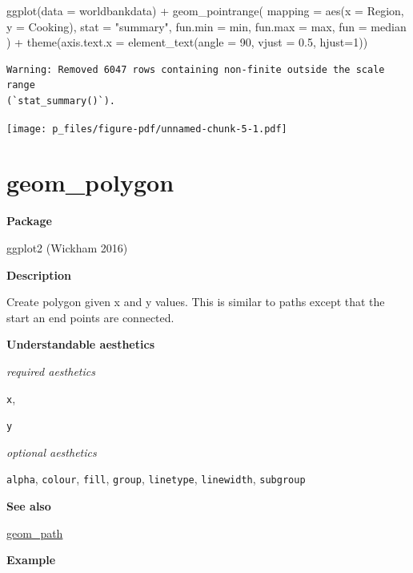 \documentclass[
  letterpaper,
  DIV=11,
  numbers=noendperiod]{scrreprt}
\newenvironment{Shaded}{\begin{snugshade}}{\end{snugshade}}
\newcommand{\AttributeTok}[1]{\textcolor[rgb]{0.40,0.45,0.13}{#1}}
\newcommand{\DecValTok}[1]{\textcolor[rgb]{0.68,0.00,0.00}{#1}}
\newcommand{\FloatTok}[1]{\textcolor[rgb]{0.68,0.00,0.00}{#1}}
\newcommand{\FunctionTok}[1]{\textcolor[rgb]{0.28,0.35,0.67}{#1}}
\newcommand{\NormalTok}[1]{\textcolor[rgb]{0.00,0.23,0.31}{#1}}
\newcommand{\SpecialCharTok}[1]{\textcolor[rgb]{0.37,0.37,0.37}{#1}}
\newcommand{\StringTok}[1]{\textcolor[rgb]{0.13,0.47,0.30}{#1}}
\begin{document}
\begin{Shaded}
\begin{Highlighting}[]
\FunctionTok{ggplot}\NormalTok{(}\AttributeTok{data =}\NormalTok{ worldbankdata) }\SpecialCharTok{+}
  \FunctionTok{geom\_pointrange}\NormalTok{(}
    \AttributeTok{mapping =} \FunctionTok{aes}\NormalTok{(}\AttributeTok{x =}\NormalTok{ Region, }\AttributeTok{y =}\NormalTok{ Cooking),}
    \AttributeTok{stat =} \StringTok{"summary"}\NormalTok{,}
    \AttributeTok{fun.min =}\NormalTok{ min,}
    \AttributeTok{fun.max =}\NormalTok{ max,}
    \AttributeTok{fun =}\NormalTok{ median}
\NormalTok{  ) }\SpecialCharTok{+} 
  \FunctionTok{theme}\NormalTok{(}\AttributeTok{axis.text.x =} \FunctionTok{element\_text}\NormalTok{(}\AttributeTok{angle =} \DecValTok{90}\NormalTok{, }\AttributeTok{vjust =} \FloatTok{0.5}\NormalTok{, }\AttributeTok{hjust=}\DecValTok{1}\NormalTok{))}
\end{Highlighting}
\end{Shaded}

\begin{verbatim}
Warning: Removed 6047 rows containing non-finite outside the scale range
(`stat_summary()`).
\end{verbatim}

\texttt{[image: p\_files/figure-pdf/unnamed-chunk-5-1.pdf]}

\section{geom\_polygon}\label{geom_polygon}

\textbf{Package}

ggplot2 (Wickham 2016)

\textbf{Description}

Create polygon given x and y values. This is similar to paths except
that the start an end points are connected.

\textbf{Understandable aesthetics}

\emph{required aesthetics}

\texttt{x},

\texttt{y}

\emph{optional aesthetics}

\texttt{alpha}, \texttt{colour}, \texttt{fill}, \texttt{group},
\texttt{linetype}, \texttt{linewidth}, \texttt{subgroup}

\textbf{See also}

\hyperref[path]{geom\_path}

\textbf{Example}
\end{document}
